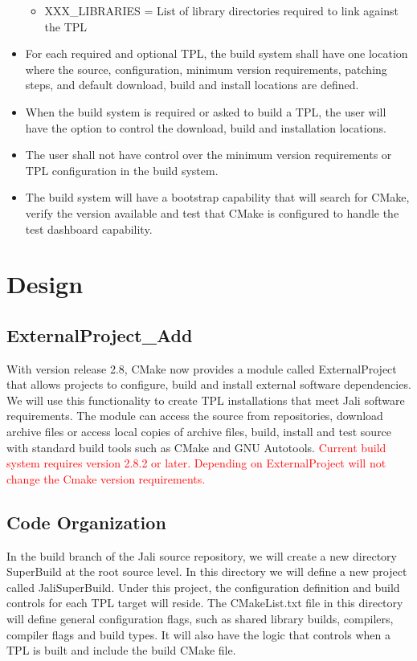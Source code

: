 \documentclass[12pt]{article}
\begin{document}
\begin{itemize}
\begin{itemize}
\item XXX\_LIBRARIES = List of library directories required to link against the TPL
\end{itemize}
\item For each required and optional TPL, the build system shall have one location where the source, configuration,
          minimum version requirements, patching steps, and default download, build and install locations are defined.
\item When the build system is required or asked to build a TPL, the user will have the option to control the download,
          build and installation locations.
\item The user shall not have control over the minimum version requirements or TPL configuration in the build system.
\item  The build system will have a bootstrap capability that will search for CMake, verify the version available and test 
           that CMake is configured to handle the test dashboard capability.                   
                            
\end{itemize}

\section{Design}

\subsection{ExternalProject\_Add}
With version release 2.8, CMake now provides a module called ExternalProject that allows projects to configure, build
and install external software dependencies. We will use this functionality to create TPL installations that meet Jali
software requirements. The module can access the source from repositories, download archive files or access local copies 
of archive files, build, install and test source with standard build tools such as CMake and GNU Autotools. 
\textcolor{red}{Current build system requires version 2.8.2 or later. Depending on ExternalProject will not change the
Cmake version requirements.}

\subsection{Code Organization}
In the build branch of the Jali source repository, we will create a new directory {SuperBuild} at the root source level.
In this directory we will define a new project called {JaliSuperBuild}. Under this project,  the configuration definition
and build controls for each TPL target will reside. The CMakeList.txt file in this directory will define general configuration
flags, such as shared library builds, compilers, compiler flags and build types. It will also have the logic that controls
when a TPL is built and include the build CMake file.
\end{document}
